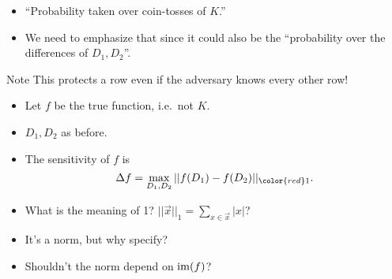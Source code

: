 \begin{frame}
  \begin{question}
    \begin{itemize}
      \item \enquote{Probability taken over coin-tosses of \(K\).}
      \item We need to emphasize that since it could also be the 
        \enquote{probability over the differences of \(D_1, D_2\)}.
    \end{itemize}
  \end{question}
\end{frame}

\begin{frame}
  \begin{block}{Note}
    This protects a row even if the adversary knows every other row!
  \end{block}
\end{frame}

\begin{frame}
  \begin{definition}[Sensitivity]
    \begin{itemize}
      \item Let \(f\) be the true function, i.e.\ not \(K\).
      \item \(D_1, D_2\) as before.
      \item The sensitivity of \(f\) is \[
          \Delta f = \max_{D_1, D_2} || f(D_1) - f(D_2) ||_{\color{red} 1}.
        \]
    \end{itemize}
  \end{definition}

  \pause{}

  \begin{question}
    \begin{itemize}
      \item What is the meaning of {\color{red} 1}?
        \(||\vec x||_1 = \sum_{x\in \vec x} |x|\)?
      \item It's a norm, but why specify?
      \item Shouldn't the norm depend on \(\operatorname{im}(f)\)?
    \end{itemize}
  \end{question}
\end{frame}


